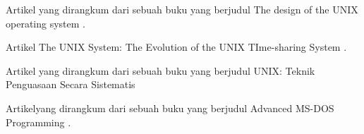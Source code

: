 \newpage

	\vspace*{1,5cm}Artikel yang dirangkum dari sebuah buku yang berjudul The design of the UNIX operating system \cite{bach1986design}.
		
	\vspace*{1cm}Artikel The UNIX System: The Evolution of the UNIX TIme-sharing System \cite{ritchie1984unix}.
	
	\vspace*{1cm}Artikel yang dirangkum dari sebuah buku yang berjudul UNIX: Teknik Penguasaan Secara Sistematis \cite{setiawanunix}
	
	\vspace*{1cm}Artikelyang dirangkum dari sebuah buku yang berjudul Advanced MS-DOS Programming \cite{duncan1988advanced}.